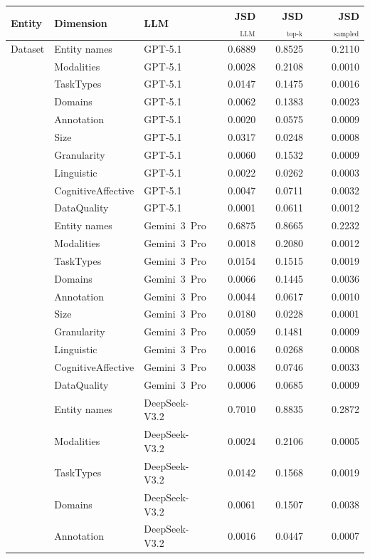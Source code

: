 \begin{tabular}{lllrrr}
\toprule
Entity & Dimension & LLM & JSD$_{\mathrm{LLM}}$ & JSD$_{\mathrm{top\text{-}k}}$ & JSD$_{\mathrm{sampled}}$ \\
\midrule
Dataset & Entity names & GPT-5.1 & 0.6889 & 0.8525 & 0.2110 \\
 & Modalities & GPT-5.1 & 0.0028 & 0.2108 & 0.0010 \\
 & TaskTypes & GPT-5.1 & 0.0147 & 0.1475 & 0.0016 \\
 & Domains & GPT-5.1 & 0.0062 & 0.1383 & 0.0023 \\
 & Annotation & GPT-5.1 & 0.0020 & 0.0575 & 0.0009 \\
 & Size & GPT-5.1 & 0.0317 & 0.0248 & 0.0008 \\
 & Granularity & GPT-5.1 & 0.0060 & 0.1532 & 0.0009 \\
 & Linguistic & GPT-5.1 & 0.0022 & 0.0262 & 0.0003 \\
 & CognitiveAffective & GPT-5.1 & 0.0047 & 0.0711 & 0.0032 \\
 & DataQuality & GPT-5.1 & 0.0001 & 0.0611 & 0.0012 \\
 & Entity names & Gemini~3~Pro & 0.6875 & 0.8665 & 0.2232 \\
 & Modalities & Gemini~3~Pro & 0.0018 & 0.2080 & 0.0012 \\
 & TaskTypes & Gemini~3~Pro & 0.0154 & 0.1515 & 0.0019 \\
 & Domains & Gemini~3~Pro & 0.0066 & 0.1445 & 0.0036 \\
 & Annotation & Gemini~3~Pro & 0.0044 & 0.0617 & 0.0010 \\
 & Size & Gemini~3~Pro & 0.0180 & 0.0228 & 0.0001 \\
 & Granularity & Gemini~3~Pro & 0.0059 & 0.1481 & 0.0009 \\
 & Linguistic & Gemini~3~Pro & 0.0016 & 0.0268 & 0.0008 \\
 & CognitiveAffective & Gemini~3~Pro & 0.0038 & 0.0746 & 0.0033 \\
 & DataQuality & Gemini~3~Pro & 0.0006 & 0.0685 & 0.0009 \\
 & Entity names & DeepSeek-V3.2 & 0.7010 & 0.8835 & 0.2872 \\
 & Modalities & DeepSeek-V3.2 & 0.0024 & 0.2106 & 0.0005 \\
 & TaskTypes & DeepSeek-V3.2 & 0.0142 & 0.1568 & 0.0019 \\
 & Domains & DeepSeek-V3.2 & 0.0061 & 0.1507 & 0.0038 \\
 & Annotation & DeepSeek-V3.2 & 0.0016 & 0.0447 & 0.0007 \\

\end{tabular}
